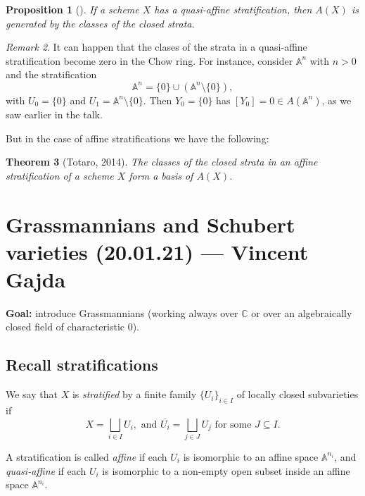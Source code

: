 \documentclass[12pt,a4paper]{amsart}
\theoremstyle{plain}
\newtheorem{thm}{Theorem}
\newtheorem{prop}[thm]{Proposition}
\theoremstyle{definition}
\theoremstyle{remark}
\newtheorem{rem}[thm]{Remark}
\begin{document}
\begin{prop}[{\cite[Proposition 1.17]{eh16}}]
    If a scheme $X$ has a quasi-affine stratification, then $A(X)$ is generated by the classes of the closed strata.
\end{prop}

\begin{rem}
    It can happen that the clases of the strata in a quasi-affine stratification become zero in the Chow ring.
    For instance, consider $\mathbb{A}^{n}$ with $n>0$ and the stratification
    \[ \mathbb{A}^{n}=\{0\}\cup (\mathbb{A}^{n}\setminus \{ 0 \}), \]
    with $U_{0}=\{0\}$ and $U_{1}=\mathbb{A}^{n}\setminus \{0\}$.
    Then $Y_{0}=\{ 0\}$ has $[Y_{0}]=0\in A(\mathbb{A}^{n})$, as we saw earlier in the talk.
\end{rem}

But in the case of affine stratifications we have the following:

\begin{thm}[Totaro, 2014]
    The classes of the closed strata in an affine stratification of a scheme $X$ form a basis of $A(X)$.
\end{thm}

\section{Grassmannians and Schubert varieties (20.01.21) --- Vincent Gajda}

\textbf{Goal:} introduce Grassmannians (working always over $\mathbb{C}$ or over an algebraically closed field of characteristic $0$).

\subsection{Recall stratifications}

We say that $X$ is \textit{stratified} by a finite family $\{U_{i}\}_{i\in I}$ of locally closed subvarieties if
\[ X=\bigsqcup_{i\in I}U_{i}, \text{ and } \overline{U_{i}}=\bigsqcup_{j\in J}U_{j} \text{ for some }J\subseteq I. \]

A stratification is called \textit{affine} if each $U_{i}$ is isomorphic to an affine space $\mathbb{A}^{n_{i}}$, and \textit{quasi-affine} if each $U_{i}$ is isomorphic to a non-empty open subset inside an affine space $\mathbb{A}^{n_{i}}$.
\end{document}

